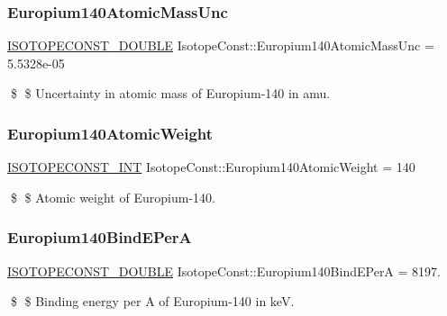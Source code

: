 \subsubsection{\texorpdfstring{Europium140\+Atomic\+Mass\+Unc}{Europium140AtomicMassUnc}}
{\footnotesize\ttfamily \mbox{\hyperlink{group___isotope_const-_macros_ga8f45a7272ce02c0b4c65c44636ed719a}{I\+S\+O\+T\+O\+P\+E\+C\+O\+N\+S\+T\+\_\+\+D\+O\+U\+B\+LE}} Isotope\+Const\+::\+Europium140\+Atomic\+Mass\+Unc = 5.\+5328e-\/05}

\$ \$ Uncertainty in atomic mass of Europium-\/140 in amu. \mbox{\label{group___isotope_const-_europium-_eu140_gae77310797a8f972c6ccc8c01fdb8b552}} 
\subsubsection{\texorpdfstring{Europium140\+Atomic\+Weight}{Europium140AtomicWeight}}
{\footnotesize\ttfamily \mbox{\hyperlink{group___isotope_const-_macros_ga5f18360b3e99483a35c32d789e62621c}{I\+S\+O\+T\+O\+P\+E\+C\+O\+N\+S\+T\+\_\+\+I\+NT}} Isotope\+Const\+::\+Europium140\+Atomic\+Weight = 140}

\$ \$ Atomic weight of Europium-\/140. \mbox{\label{group___isotope_const-_europium-_eu140_ga37588f4ccd6157a5f6e9841db81ff93e}} 
\subsubsection{\texorpdfstring{Europium140\+Bind\+E\+PerA}{Europium140BindEPerA}}
{\footnotesize\ttfamily \mbox{\hyperlink{group___isotope_const-_macros_ga8f45a7272ce02c0b4c65c44636ed719a}{I\+S\+O\+T\+O\+P\+E\+C\+O\+N\+S\+T\+\_\+\+D\+O\+U\+B\+LE}} Isotope\+Const\+::\+Europium140\+Bind\+E\+PerA = 8197.}

\$ \$ Binding energy per A of Europium-\/140 in keV. \mbox{\label{group___isotope_const-_europium-_eu140_gad02acd0f16fe9a5d23264e40459c41dc}} 
